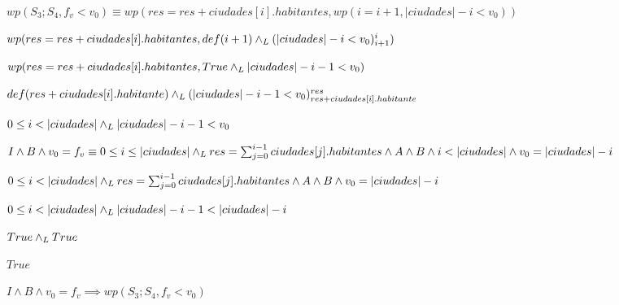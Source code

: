 \documentclass[10pt,a4paper]{article}
\begin{document}
$wp(S_{3};S_{4}, f_{v} < v_{0}) \equiv wp(res = res + ciudades[i].habitantes, wp(i = i + 1, |ciudades| - i < v_{0}))$ \equiv \par
\vspace{5px}
$wp(res = res + ciudades[i].habitantes, def(i+1) \land _L (|ciudades| - i < v_{0})_{i+1}^{i}) $ \equiv \par
\vspace{5px}
$wp(res = res + ciudades[i].habitantes, True \land _L |ciudades| - i - 1 < v_{0})$ \equiv \par
\vspace{5px}
$def(res + ciudades[i].habitante) \land _L (|ciudades| - i - 1 < v_{0})_{res + ciudades[i].habitante}^{res}$ \equiv \par
\vspace{5px}
$0 \leq i < |ciudades| \land _L |ciudades| - i - 1 < v_{0}$ \equiv \par
\vspace{20px}
$I \wedge  B \wedge v_{0}=f_{v} \equiv 0 \leq i \leq |ciudades| \land _L res = \sum_{j=0}^{i-1} ciudades[j].habitantes \wedge A \wedge B \wedge i < |ciudades| \wedge v_{0}=|ciudades| - i$ \par
\begin{center}
    \equiv \; $0 \leq i < |ciudades| \land _L res = \sum_{j=0}^{i-1} ciudades[j].habitantes \wedge A \wedge B \wedge v_{0}=|ciudades| - i$ \implies \par
    \vspace{5px}
    $0 \leq i < |ciudades| \land _L |ciudades| - i - 1 < |ciudades| - i$ \equiv \par
    \vspace{5px}
    $True \land _L True$ \equiv \par
    \vspace{5px}
    $True$ \par
    \vspace{5px}
    $I \wedge  B \wedge v_{0}=f_{v} \implies wp(S_{3};S_{4}, f_{v} < v_{0})$
\end{center}
\end{document}
